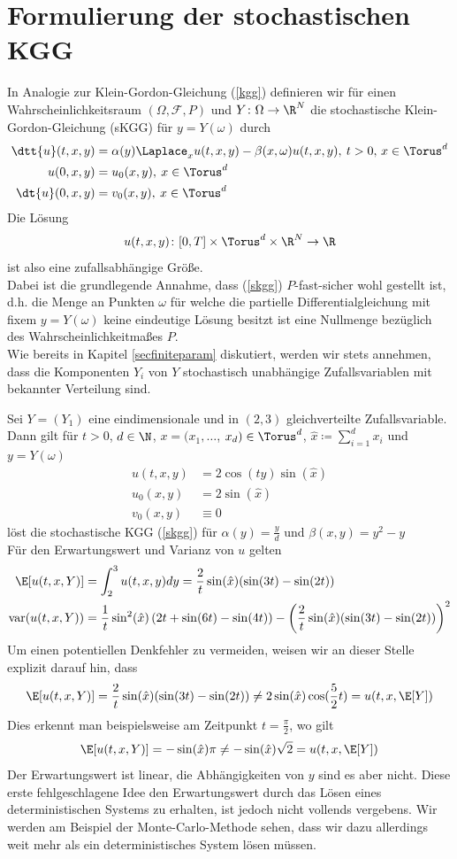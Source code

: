 \section{Formulierung der stochastischen KGG}
In Analogie zur Klein-Gordon-Gleichung (\ref{kgg}) definieren wir für einen Wahrscheinlichkeitsraum $(\Omega,\mathcal{F},P)$ und $Y\colon\Omega\to\R^N$ die stochastische Klein-Gordon-Gleichung (sKGG) für $y=Y(\omega)$ durch
\begin{align}
\label{skgg}
\dtt{u}(t,x,y)&=\alpha(y) \Laplace_x u(t,x,y) - \beta(x,\omega)u(t,x,y), \: t>0, \, x\in \Torus^d\\
u(0,x,y)&=u_0(x,y), \: x\in \Torus^d\\
\dt{u}(0,x,y)&=v_0(x,y), \: x\in \Torus^d
\end{align}
Die Lösung \[u(t,x,y)\colon [0,T]\times\Torus^d\times \R^N\to\R\] ist also eine zufallsabhängige Größe.\\
Dabei ist die grundlegende Annahme, dass (\ref{skgg}) $P$-fast-sicher wohl gestellt ist, d.h. die Menge an Punkten $\omega$ für welche die partielle Differentialgleichung mit fixem $y=Y(\omega)$ keine eindeutige Lösung besitzt ist eine Nullmenge bezüglich des Wahrscheinlichkeitmaßes $P$.\\
Wie bereits in Kapitel \ref{secfiniteparam} diskutiert, werden wir stets annehmen, dass die Komponenten $Y_i$ von $Y$ stochastisch unabhängige Zufallsvariablen mit bekannter Verteilung sind.
\begin{mathbsp}
\label{bsp:trial1}
Sei $Y=(Y_1)$ eine eindimensionale und in $(2,3)$ gleichverteilte Zufallsvariable. Dann gilt für $t>0$, $d\in\N$, $x=(x_1,\dots$, $x_d)\in\Torus^d$, $\hat{x}\coloneqq \sum_{i=1}^d x_i$ und $y=Y(\omega)$
\begin{align*}
u(t,x,y)&=2\cos(ty)\sin(\hat{x})\\
u_0(x,y)&=2\sin(\hat{x})\\
v_0(x,y)&\equiv 0
\end{align*}
löst die stochastische KGG (\ref{skgg}) für $\alpha(y)=\frac{y}{d}$ und $\beta(x,y)=y^2-y$\\
Für den Erwartungswert und Varianz von $u$ gelten
\begin{align*}
\E[u(t,x,Y)]&=\int_2^3u(t,x,y)dy=\frac{2}{t}\sin(\hat{x})(\sin(3t) - \sin(2t))\\
\text{var}(u(t,x,Y))&=\frac{1}{t}\sin^2(\hat{x})\left(2t + \sin(6t) - \sin(4t)\right)- \left(\frac{2}{t}\sin(\hat{x})(\sin(3t) - \sin(2t))\right)^2
\end{align*}
Um einen potentiellen Denkfehler zu vermeiden, weisen wir an dieser Stelle explizit darauf hin, dass 
\[\E[u(t,x,Y)]=\frac{2}{t}\sin(\hat{x})(\sin(3t) - \sin(2t))\neq 2\sin(\hat{x})\cos(\frac{5}{2}t)=u(t,x,\E[Y])\]
Dies erkennt man beispielsweise am Zeitpunkt $t=\frac{\pi}{2}$, wo gilt
\[\E[u(t,x,Y)]=-\sin(\hat{x})\pi \neq -\sin(\hat{x})\sqrt{2}=u(t,x,\E[Y])\]
Der Erwartungswert ist linear, die Abhängigkeiten von $y$ sind es aber nicht. Diese erste fehlgeschlagene Idee den Erwartungswert durch das Lösen eines deterministischen Systems zu erhalten, ist jedoch nicht vollends vergebens. Wir werden am Beispiel der Monte-Carlo-Methode sehen, dass wir dazu allerdings weit mehr als ein deterministisches System lösen müssen.
\end{mathbsp}
